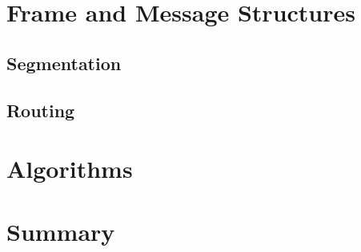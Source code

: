 \documentclass{article}
\begin{document}
\section{Frame and Message Structures}

\subsection{Segmentation}

\subsection{Routing}

\section{Algorithms}

\section{Summary}
\end{document}
